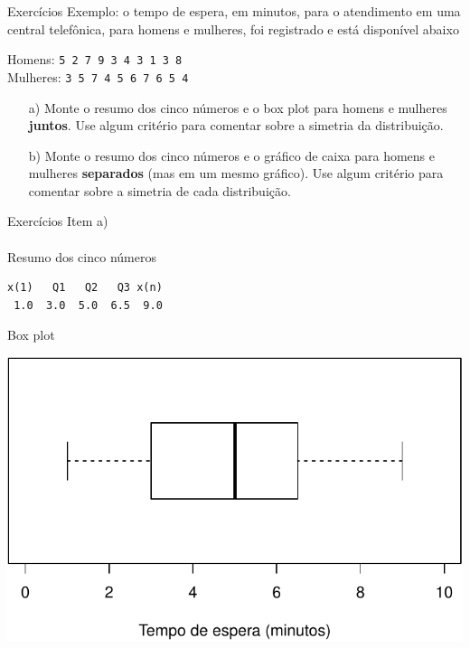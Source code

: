 \documentclass[10pt]{beamer}\usepackage[]{graphicx}\usepackage[]{color}
\makeatletter
\newenvironment{kframe}{%
 \def\at@end@of@kframe{}%
 \ifinner\ifhmode%
  \def\at@end@of@kframe{\end{minipage}}%
  \begin{minipage}{\columnwidth}%
 \fi\fi%
 \def\FrameCommand##1{\hskip\@totalleftmargin \hskip-\fboxsep
 \colorbox{shadecolor}{##1}\hskip-\fboxsep
     \hskip-\linewidth \hskip-\@totalleftmargin \hskip\columnwidth}%
 \MakeFramed {\advance\hsize-\width
   \@totalleftmargin\z@ \linewidth\hsize
   \@setminipage}}%
 {\par\unskip\endMakeFramed%
 \at@end@of@kframe}
\newenvironment{knitrout}{}{} %
\theoremstyle{definition}
\makeatother
\begin{document}
\begin{frame}{Exercícios}
  Exemplo: o tempo de espera, em minutos, para o atendimento em uma
  central telefônica, para homens e mulheres, foi registrado e está
  disponível abaixo
  \begin{center}
    Homens: \texttt{5 2 7 9 3 4 3 1 3 8}\\
    Mulheres: \texttt{3 5 7 4 5 6 7 6 5 4}
  \end{center}
  \begin{itemize}
  \item[a)] Monte o resumo dos cinco números e o box plot para
    homens e mulheres \textbf{juntos}. Use algum critério para comentar
    sobre a simetria da distribuição.
  \item[b)] Monte o resumo dos cinco números e o gráfico de caixa para
    homens e mulheres \textbf{separados} (mas em um mesmo gráfico). Use
    algum critério para comentar sobre a simetria de cada distribuição.
  \end{itemize}

\end{frame}

\begin{frame}[fragile]{Exercícios}
Item a) \\~\\
Resumo dos cinco números
\begin{knitrout}\footnotesize
{}\color{fgcolor}\begin{kframe}
\begin{verbatim}
x(1)   Q1   Q2   Q3 x(n) 
 1.0  3.0  5.0  6.5  9.0 
\end{verbatim}
\end{kframe}
\end{knitrout}
Box plot
\begin{knitrout}\footnotesize
{}\color{fgcolor}

{\centering \includegraphics[width=.6\textwidth]{figure/unnamed-chunk-25-1} 

}



\end{knitrout}
\end{frame}
\end{document}
